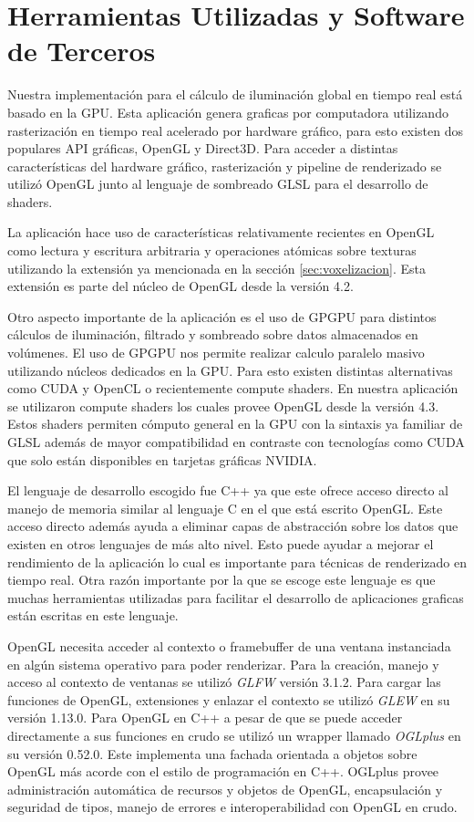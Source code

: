 \section{Herramientas Utilizadas y Software de Terceros}
Nuestra implementación para el cálculo de iluminación global en tiempo real está basado en la \ac{GPU}. Esta aplicación genera graficas por computadora utilizando rasterización en tiempo real acelerado por hardware gráfico, para esto existen dos populares API gráficas, OpenGL y Direct3D. Para acceder a distintas características del hardware gráfico, rasterización y pipeline de renderizado se utilizó OpenGL junto al lenguaje de sombreado GLSL para el desarrollo de shaders. 

La aplicación hace uso de características relativamente recientes en OpenGL como lectura y escritura arbitraria y operaciones atómicas sobre texturas utilizando la extensión ya mencionada en la sección \ref{sec:voxelizacion}. Esta extensión es parte del núcleo de OpenGL desde la versión 4.2. 

Otro aspecto importante de la aplicación es el uso de \ac{GPGPU} para distintos cálculos de iluminación, filtrado y sombreado sobre datos almacenados en volúmenes. El uso de \ac{GPGPU} nos permite realizar calculo paralelo masivo utilizando núcleos dedicados en la \ac{GPU}. Para esto existen distintas alternativas como CUDA y OpenCL o recientemente compute shaders. En nuestra aplicación se utilizaron compute shaders los cuales provee OpenGL desde la versión 4.3. Estos shaders permiten cómputo general en la GPU con la sintaxis ya familiar de GLSL además de mayor compatibilidad en contraste con tecnologías como CUDA que solo están disponibles en tarjetas gráficas NVIDIA.

El lenguaje de desarrollo escogido fue C++ ya que este ofrece acceso directo al manejo de memoria similar al lenguaje C en el que está escrito OpenGL. Este acceso directo además ayuda a eliminar capas de abstracción sobre los datos que existen en otros lenguajes de más alto nivel. Esto puede ayudar a mejorar el rendimiento de la aplicación lo cual es importante para técnicas de renderizado en tiempo real. Otra razón importante por la que se escoge este lenguaje es que muchas herramientas utilizadas para facilitar el desarrollo de aplicaciones graficas están escritas en este lenguaje.

OpenGL necesita acceder al contexto o framebuffer de una ventana instanciada en algún sistema operativo para poder renderizar. Para la creación, manejo y acceso al contexto de ventanas se utilizó \emph{GLFW} versión 3.1.2. Para cargar las funciones de OpenGL, extensiones y enlazar el contexto se utilizó \emph{GLEW} en su versión 1.13.0. Para OpenGL en C++ a pesar de que se puede acceder directamente a sus funciones en crudo se utilizó un wrapper llamado \emph{OGLplus} en su versión 0.52.0. Este implementa una fachada orientada a objetos sobre OpenGL más acorde con el estilo de programación en C++. OGLplus provee administración automática de recursos y objetos de OpenGL, encapsulación y seguridad de tipos, manejo de errores e interoperabilidad con OpenGL en crudo.

